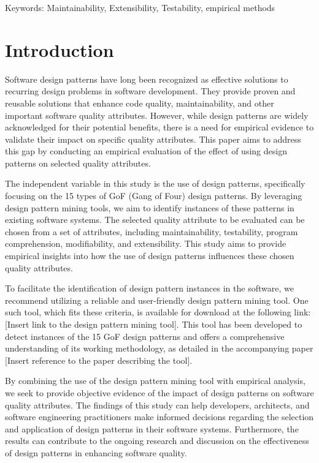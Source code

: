\documentclass[conference]{IEEEtran}
\begin{document}
	\begin{IEEEkeywords}
		Keywords: Maintainability, Extensibility, Testability, empirical methods
	\end{IEEEkeywords}
	
	\section{Introduction}
	Software design patterns have long been recognized as effective solutions to recurring design problems in software development. They provide proven and reusable solutions that enhance code quality, maintainability, and other important software quality attributes. However, while design patterns are widely acknowledged for their potential benefits, there is a need for empirical evidence to validate their impact on specific quality attributes. This paper aims to address this gap by conducting an empirical evaluation of the effect of using design patterns on selected quality attributes.
	
	The independent variable in this study is the use of design patterns, specifically focusing on the 15 types of GoF (Gang of Four) design patterns. By leveraging design pattern mining tools, we aim to identify instances of these patterns in existing software systems. The selected quality attribute to be evaluated can be chosen from a set of attributes, including maintainability, testability, program comprehension, modifiability, and extensibility. This study aims to provide empirical insights into how the use of design patterns influences these chosen quality attributes.
	
	To facilitate the identification of design pattern instances in the software, we recommend utilizing a reliable and user-friendly design pattern mining tool. One such tool, which fits these criteria, is available for download at the following link: [Insert link to the design pattern mining tool]. This tool has been developed to detect instances of the 15 GoF design patterns and offers a comprehensive understanding of its working methodology, as detailed in the accompanying paper [Insert reference to the paper describing the tool].
	
	By combining the use of the design pattern mining tool with empirical analysis, we seek to provide objective evidence of the impact of design patterns on software quality attributes. The findings of this study can help developers, architects, and software engineering practitioners make informed decisions regarding the selection and application of design patterns in their software systems. Furthermore, the results can contribute to the ongoing research and discussion on the effectiveness of design patterns in enhancing software quality.
	
\end{document}
